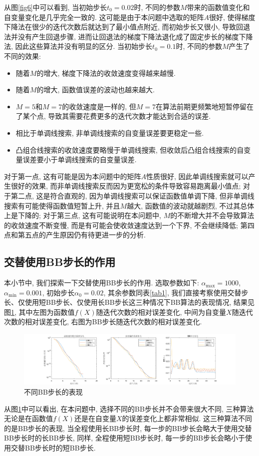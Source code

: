\documentclass[UTF8]{ctexart}
\begin{document}
从图\ref{fig6}中可以看到, 当初始步长$t_0=0.02$时, 不同的参数$M$带来的函数值变化和自变量变化是几乎完全一致的. 这可能是由于本问题中选取的矩阵$A$很好, 使得梯度下降法在很少的迭代次数后就达到了最小值点附近, 而初始步长又很小, 导致回退法并没有产生回退步骤, 进而让回退法的梯度下降法退化成了固定步长的梯度下降法, 因此这些算法并没有明显的区分. 当初始步长$t_0=0.1$时, 不同的参数$M$产生了不同的效果: 
\begin{itemize}
    \item 随着$M$的增大, 梯度下降法的收敛速度变得越来越慢.
    \item 随着$M$的增大, 函数值误差的波动也越来越大.
    \item $M=5$和$M=7$的收敛速度是一样的, 但$M=7$在算法前期更频繁地短暂停留在了某个点, 导致其需要花费更多的迭代次数才能达到合适的误差. 
    \item 相比于单调线搜索, 非单调线搜索的自变量误差要更稳定一些. 
    \item 凸组合线搜索的收敛速度要略慢于单调线搜索, 但收敛后凸组合线搜索的自变量误差要小于单调线搜索的自变量误差. 
\end{itemize}
对于第一点, 这有可能是因为本问题中的矩阵$A$性质很好, 因此单调线搜索就可以产生很好的效果, 而非单调线搜索反而因为更宽松的条件导致容易跑离最小值点; 对于第二点, 这是符合直观的, 因为单调线搜索可以保证函数值单调下降, 但非单调线搜索有可能使得函数值短暂上升, 并且$M$越大, 函数值的波动就越剧烈, 不过其总体上是下降的; 对于第三点, 这有可能说明在本问题中, $M$的不断增大并不会导致算法的收敛速度不断变慢, 而是有可能会使收敛速度达到一个下界, 不会继续降低; 第四点和第五点的产生原因仍有待更进一步的分析. 

\subsection{交替使用BB步长的作用}
本小节中, 我们探索一下交替使用BB步长的作用. 选取参数如下: $\alpha_{\max}=1000$, $\alpha_{\min}=0.001$, 初始步长$\alpha_0=0.02$, 其余参数同表\ref{tab1}, 我们直接考察使用交替步长、仅使用短BB步长、仅使用长BB步长这三种情况下BB算法的表现情况, 结果见图\ref{fig7}, 其中左图为函数值$f(X)$随迭代次数的相对误差变化, 中间为自变量$X$随迭代次数的相对误差变化, 右图为BB步长随迭代次数的相对误差变化. \par
\begin{figure}[htb]
    \centering
    \includegraphics[width=\textwidth]{Q2-figure/7.png}
    \caption{不同BB步长的表现}\label{fig7}
\end{figure}
从图\ref{fig7}中可以看出, 在本问题中, 选择不同的BB步长并不会带来很大不同, 三种算法无论是在函数值$f(X)$还是在自变量$X$的误差变化上都非常相似. 这三种算法不同的是BB步长的表现, 当全程使用长BB步长时, 每一步的BB步长会略大于使用交替BB步长时的长BB步长, 同样, 全程使用短BB步长时, 每一步的BB步长会略小于使用交替BB步长时的短BB步长. 
\end{document}
